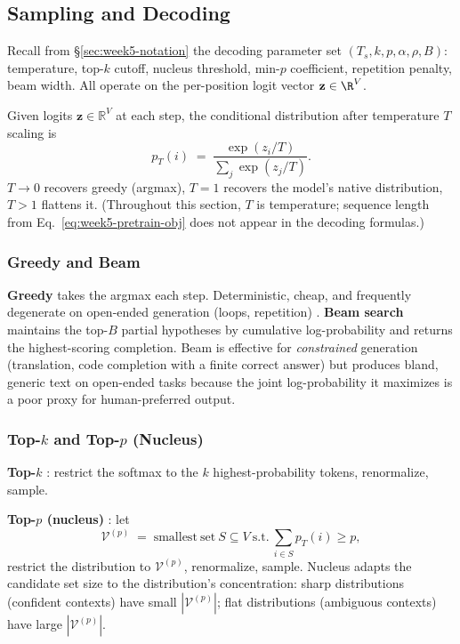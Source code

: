 \subsection{Sampling and Decoding}

Recall from \S\ref{sec:week5-notation} the decoding parameter set
$(T_s, k, p, \alpha, \rho, B)$: temperature, top-$k$ cutoff, nucleus
threshold, min-$p$ coefficient, repetition penalty, beam width. All
operate on the per-position logit vector $\mathbf{z} \in \R^{V}$.

Given logits $\mathbf{z} \in \mathbb{R}^V$ at each step, the
conditional distribution after temperature $T$ scaling is
\begin{equation}
\label{eq:week5-softmax-temp}
p_T(i) \;=\; \frac{\exp(z_i / T)}{\sum_j \exp(z_j / T)}.
\end{equation}
$T \to 0$ recovers greedy (argmax), $T = 1$ recovers the model's
native distribution, $T > 1$ flattens it. (Throughout this section,
$T$ is temperature; sequence length from
Eq.~\eqref{eq:week5-pretrain-obj} does not appear in the decoding
formulas.)

\subsubsection{Greedy and Beam}

\textbf{Greedy} takes the argmax each step. Deterministic, cheap, and
frequently degenerate on open-ended generation (loops, repetition)
\citep{holtzman2020curious}. \textbf{Beam search} maintains the
top-$B$ partial hypotheses by cumulative log-probability and returns
the highest-scoring completion. Beam is effective for
\emph{constrained} generation (translation, code completion with a
finite correct answer) but produces bland, generic text on open-ended
tasks because the joint log-probability it maximizes is a poor
proxy for human-preferred output.

\subsubsection{\texorpdfstring{Top-$k$ and Top-$p$ (Nucleus)}{Top-k and Top-p (Nucleus)}}

\textbf{Top-$k$} \citep{fan2018hierarchical}: restrict the softmax to
the $k$ highest-probability tokens, renormalize, sample.

\textbf{Top-$p$ (nucleus)} \citep{holtzman2020curious}: let
\begin{equation}
\label{eq:week5-nucleus}
\mathcal{V}^{(p)}
 \;=\; \mathrm{smallest~set}\ S \subseteq V
       \ \mathrm{s.t.}\ \sum_{i \in S} p_T(i) \ge p,
\end{equation}
restrict the distribution to $\mathcal{V}^{(p)}$, renormalize,
sample. Nucleus adapts the candidate set size to the distribution's
concentration: sharp distributions (confident contexts) have small
$|\mathcal{V}^{(p)}|$; flat distributions (ambiguous contexts) have
large $|\mathcal{V}^{(p)}|$.


